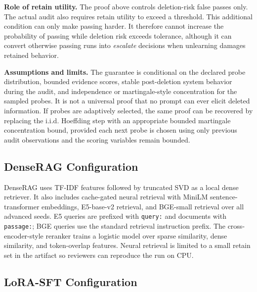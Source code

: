 \textbf{Role of retain utility.}
The proof above controls deletion-risk false passes only. The actual audit also requires retain utility to exceed a threshold. This additional condition can only make passing harder. It therefore cannot increase the probability of passing while deletion risk exceeds tolerance, although it can convert otherwise passing runs into \emph{escalate} decisions when unlearning damages retained behavior.

\textbf{Assumptions and limits.}
The guarantee is conditional on the declared probe distribution, bounded evidence scores, stable post-deletion system behavior during the audit, and independence or martingale-style concentration for the sampled probes. It is not a universal proof that no prompt can ever elicit deleted information. If probes are adaptively selected, the same proof can be recovered by replacing the i.i.d. Hoeffding step with an appropriate bounded martingale concentration bound, provided each next probe is chosen using only previous audit observations and the scoring variables remain bounded.

\subsection{DenseRAG Configuration}

DenseRAG uses TF-IDF features followed by truncated SVD as a local dense retriever. It also includes cache-gated neural retrieval with MiniLM sentence-transformer embeddings, E5-base-v2 retrieval, and BGE-small retrieval over all advanced seeds. E5 queries are prefixed with \texttt{query:} and documents with \texttt{passage:}; BGE queries use the standard retrieval instruction prefix. The cross-encoder-style reranker trains a logistic model over sparse similarity, dense similarity, and token-overlap features. Neural retrieval is limited to a small retain set in the artifact so reviewers can reproduce the run on CPU.

\subsection{LoRA-SFT Configuration}

